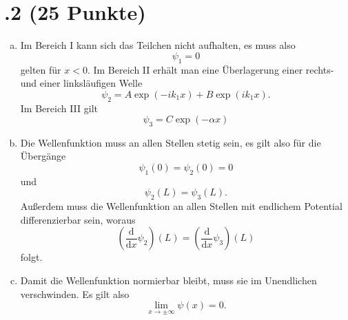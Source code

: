 \section*{\nr.2 \tittwo (25 Punkte)}
\begin{enumerate}[(a)]
\item Im Bereich I kann sich das Teilchen nicht aufhalten, es muss also
\begin{equation}
  \psi_1=0
\end{equation}
gelten für $x<0$. Im Bereich II erhält man eine Überlagerung einer rechts- und einer linksläufigen Welle
\begin{equation}
  \psi_2=A \exp\left(-ik_1x\right)+B\exp\left(ik_1x\right).
\end{equation}
Im Bereich III gilt
\begin{equation}
  \psi_3=C \exp\left(-\alpha x \right)
\end{equation}
\item Die Wellenfunktion muss an allen Stellen stetig sein, es gilt also für die Übergänge
\begin{equation}
  \psi_1(0)=\psi_2(0)=0
\end{equation}
und 
\begin{equation}
  \psi_2(L)=\psi_3(L).
\end{equation}
Außerdem muss die Wellenfunktion an allen Stellen mit endlichem Potential differenzierbar sein, woraus
\begin{equation}
  \left(\frac{\mathrm{d}}{\mathrm{d}x}\psi_2\right)\left(L\right)=\left(\frac{\mathrm{d}}{\mathrm{d}x}\psi_3\right)\left(L\right)
\end{equation}
folgt.
\item Damit die Wellenfunktion normierbar bleibt, muss sie im Unendlichen verschwinden. Es gilt also
\begin{equation}
  \lim_{x \to \pm \infty}\psi(x)=0.
\end{equation}
\end{enumerate}